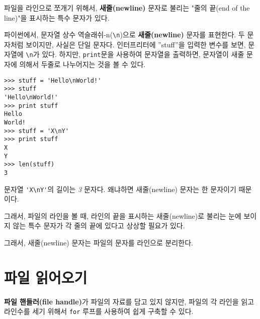 파일을 라인으로 쪼개기 위해서, {\bf 새줄(newline)} 문자로 불리는 "줄의 끝(end of the line)"을 표시하는 특수 문자가 있다.


파이썬에서, 문자열 상수 역슬래쉬-n(\verb"\n")으로 {\bf 새줄(newline)} 문자를 표현한다.
두 문자처럼 보이지만, 사실은 단일 문자다. 인터프리터에 ''stuff''을 입력한 변수를 보면, 문자열에 \verb"\n"가 있다.
하지만, {\tt print}문을 사용하여 문자열을 출력하면, 문자열이 새줄 문자에 의해서 두줄로 나누어지는 것을 볼 수 있다.

\beforeverb
\begin{verbatim}
>>> stuff = 'Hello\nWorld!'
>>> stuff
'Hello\nWorld!'
>>> print stuff
Hello
World!
>>> stuff = 'X\nY'
>>> print stuff
X
Y
>>> len(stuff)
3
\end{verbatim}
\afterverb
%

문자열 \verb"'X\nY'"의 길이는 \emph{3} 문자다. 왜냐하면 새줄(newline) 문자는 한 문자이기 때문이다.

그래서, 파일의 라인을 볼 때, 라인의 끝을 표시하는 새줄(newline)로 불리는 눈에 보이지 않는 특수 문자가 각 줄의 끝에 있다고 상상할 필요가 있다.


그래서, 새줄(newline) 문자는 파일의 문자를 라인으로 분리한다.


\section{파일 읽어오기}


{\bf 파일 핸들러(file handle)}가 파일의 자료를 담고 있지 않지만, 파일의 각 라인을 읽고 라인수를 세기 위해서 
{\tt for} 루프를 사용하여 쉽게 구축할 수 있다.

